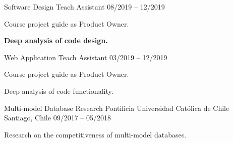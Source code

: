 \begin{cventries}
  \cventry
    {Software Design Teach Assistant} %
    { } %
    { } %
    {08/2019 – 12/2019} %
    {
      \begin{cvitems} %
        \item {Course project guide as Product Owner.}
        \item {\textbf{Deep analysis of code design.}}
      \end{cvitems}
    }
    \newline

  \cventry
    {Web Application Teach Assistant} %
    { } %
    { } %
    {03/2019 – 12/2019} %
    {
      \begin{cvitems} %
        \item {Course project guide as Product Owner.}
        \item {Deep analysis of code functionality.}
      \end{cvitems}
    }
    \newline

  \cventry
    {Multi-model Database Research} %
    {Pontificia Universidad Católica de Chile} %
    {Santiago, Chile} %
    {09/2017 – 05/2018} %
    {
      \begin{cvitems} %
        \item {Research on the competitiveness of multi-model databases.}
      \end{cvitems} 
    }

\end{cventries}

